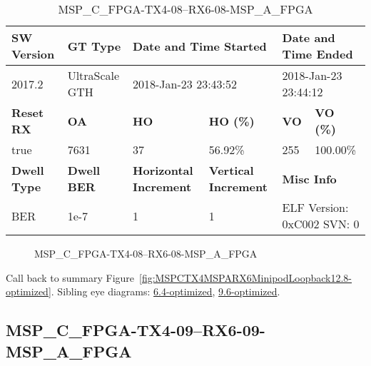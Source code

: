 \begin{table}[h]
\centering
\caption{MSP\_C\_FPGA-TX4-08--RX6-08-MSP\_A\_FPGA}
\label{tab:MSPCFPGATX408RX608MSPAFPGA12.8-optimized}
\begin{tabular}{@{}|l|l|l|l|l|l|@{}}
\toprule
\textbf{SW Version}                & \textbf{GT Type}   & \multicolumn{2}{l|}{\textbf{Date and Time Started}}            & \multicolumn{2}{l|}{\textbf{Date and Time Ended}}        \\ \midrule
2017.2                       & UltraScale GTH          & \multicolumn{2}{l|}{2018-Jan-23 23:43:52}                   & \multicolumn{2}{l|}{2018-Jan-23 23:44:12}               \\ \midrule
\textbf{Reset RX}                  & \textbf{OA} & \textbf{HO}   & \textbf{HO (\%)} & \textbf{VO} & \textbf{VO (\%)} \\ \midrule
true & 7631        & 37          & 56.92\%        & 255        & 100.00\%       \\ \midrule
\textbf{Dwell Type}                & \textbf{Dwell BER} & \textbf{Horizontal Increment} & \textbf{Vertical Increment}    & \multicolumn{2}{l|}{\textbf{Misc Info}}                  \\ \midrule
BER                            & 1e-7        & 1        & 1           & \multicolumn{2}{l|}{ELF Version: 0xC002 SVN: 0}                         \\ \bottomrule
\end{tabular}
\end{table}

\begin{figure}[h]
\caption{MSP\_C\_FPGA-TX4-08--RX6-08-MSP\_A\_FPGA} \label{fig:MSPCFPGATX408RX608MSPAFPGA12.8-optimized}
\end{figure}

Call back to summary Figure~\ref{fig:MSPCTX4MSPARX6MinipodLoopback12.8-optimized}.
Sibling eye diagrams: \hyperref[sec:MSPCFPGATX408RX608MSPAFPGA6.4-optimized]{6.4-optimized}, \hyperref[sec:MSPCFPGATX408RX608MSPAFPGA9.6-optimized]{9.6-optimized}.

\clearpage
\newpage


\subsection{MSP\_C\_FPGA-TX4-09--RX6-09-MSP\_A\_FPGA}\label{sec:MSPCFPGATX409RX609MSPAFPGA12.8-optimized}

